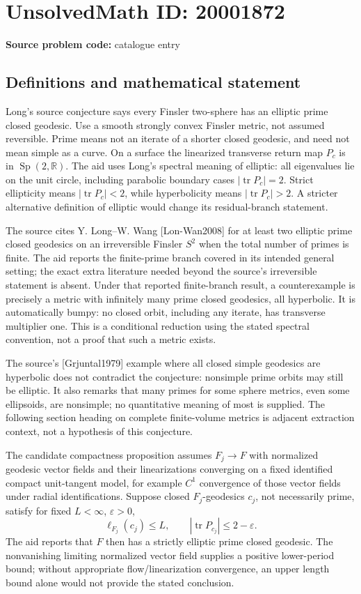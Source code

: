\documentclass[11pt]{article}
\newcommand{\R}{\mathbb{R}}
\begin{document}
\section*{UnsolvedMath ID: 20001872}
\textbf{Source problem code:} catalogue entry
\subsection{Definitions and mathematical statement}
Long's source conjecture says every Finsler two-sphere has an elliptic prime closed geodesic. Use a smooth strongly convex Finsler metric, not assumed reversible. Prime means not an iterate of a shorter closed geodesic, and need not mean simple as a curve. On a surface the linearized transverse return map \(P_c\) is in \(\operatorname{Sp}(2,\R)\). The aid uses Long's spectral meaning of elliptic: all eigenvalues lie on the unit circle, including parabolic boundary cases \(|\operatorname{tr}P_c|=2\). Strict ellipticity means \(|\operatorname{tr}P_c|<2\), while hyperbolicity means \(|\operatorname{tr}P_c|>2\). A stricter alternative definition of elliptic would change its residual-branch statement.

The source cites Y. Long--W. Wang [Lon-Wan2008] for at least two elliptic prime closed geodesics on an irreversible Finsler \(S^2\) when the total number of primes is finite. The aid reports the finite-prime branch covered in its intended general setting; the exact extra literature needed beyond the source's irreversible statement is absent. Under that reported finite-branch result, a counterexample is precisely a metric with infinitely many prime closed geodesics, all hyperbolic. It is automatically bumpy: no closed orbit, including any iterate, has transverse multiplier one. This is a conditional reduction using the stated spectral convention, not a proof that such a metric exists.

The source's [Grjuntal1979] example where all closed simple geodesics are hyperbolic does not contradict the conjecture: nonsimple prime orbits may still be elliptic. It also remarks that many primes for some sphere metrics, even some ellipsoids, are nonsimple; no quantitative meaning of most is supplied. The following section heading on complete finite-volume metrics is adjacent extraction context, not a hypothesis of this conjecture.

The candidate compactness proposition assumes \(F_j\to F\) with normalized geodesic vector fields and their linearizations converging on a fixed identified compact unit-tangent model, for example \(C^1\) convergence of those vector fields under radial identifications. Suppose closed \(F_j\)-geodesics \(c_j\), not necessarily prime, satisfy for fixed \(L<\infty\), \(\varepsilon>0\),
\[
 \ell_{F_j}(c_j)\le L,\qquad
 |\operatorname{tr}P_{c_j}|\le2-\varepsilon.
\]
The aid reports that \(F\) then has a strictly elliptic prime closed geodesic. The nonvanishing limiting normalized vector field supplies a positive lower-period bound; without appropriate flow/linearization convergence, an upper length bound alone would not provide the stated conclusion.
\end{document}
